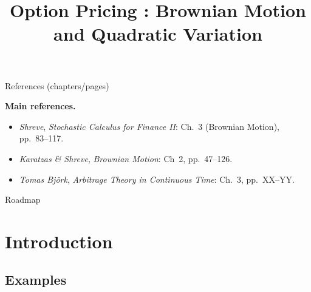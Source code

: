 \documentclass[10pt,aspectratio=169]{beamer}
\title{Option Pricing : Brownian Motion and Quadratic Variation}
\author{}
\date{}
\begin{document}
\begin{frame}
  \titlepage
\end{frame}

\begin{frame}{References (chapters/pages)}

\footnotesize
\textbf{Main references.}


\begin{itemize}\setlength{\itemsep}{0.35em}
  \item \textit{Shreve}, \emph{Stochastic Calculus for Finance II}:
  Ch.~3 (Brownian Motion), pp.~83--117.
  \item \textit{Karatzas \& Shreve}, \emph{Brownian Motion}:
  Ch~2, pp.~47--126.
  \item \textit{Tomas Bj\"ork}, \emph{Arbitrage Theory in Continuous Time}:
  Ch.~3, pp.~XX--YY.
\end{itemize}

\end{frame}
\begin{frame}{Roadmap}
  \tableofcontents[hideallsubsections]
\end{frame}

\section{Introduction}

\subsection{Examples}
\end{document}
